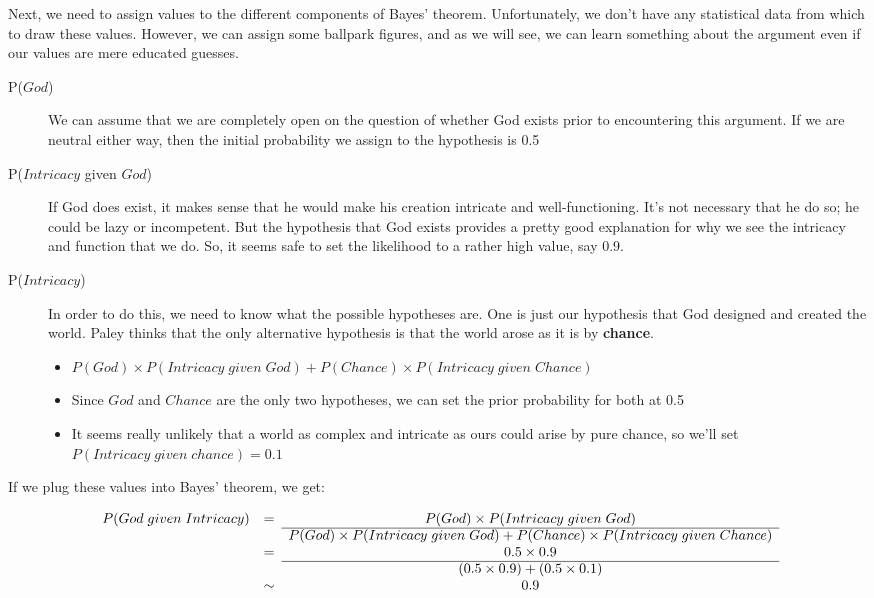 \documentclass[letterpaper,10pt]{article}
\begin{document}
Next, we need to assign values to the different components of Bayes' theorem.  Unfortunately, we don't have any statistical data from which to draw these values.  However, we can assign some ballpark figures, and as we will see, we can learn something about the argument even if our values are mere educated guesses.
\begin{description}
 \item [P($God$)] We can assume that we are completely open on the question of whether God exists prior to encountering this argument.  If we are neutral either way, then the initial probability we assign to the hypothesis is 0.5
 \item [P($Intricacy$ given $God$)] If God does exist, it makes sense that he would make his creation intricate and well-functioning. It's not necessary that he do so; he could be lazy or incompetent. But the hypothesis that God exists provides a pretty good explanation for why we see the intricacy and function that we do.  So, it seems safe to set the likelihood to a rather high value, say 0.9.
 \item [P($Intricacy$)] In order to do this, we need to know what the possible hypotheses are.  One is just our hypothesis that God designed and created the world.  Paley thinks that the only alternative hypothesis is that the world arose as it is by \textbf{chance}.
 	\begin{itemize}
 		\item $P(God)\times P(Intricacy\; given \; God) + P(Chance)\times P(Intricacy\; given\; Chance)$
 		\item Since $God$ and $Chance$ are the only two hypotheses, we can set the prior probability for both at 0.5
 		\item It seems really unlikely that a world as complex and intricate as ours could arise by pure chance, so we'll set $P(Intricacy\; given\; chance)=0.1$
 	\end{itemize}
\end{description}

If we plug these values into Bayes' theorem, we get:

\[\begin{array}{ccc}
P(God\; given \; Intricacy) & = & P(God) \times P(Intricacy\; given\; God) \\ \cline{3-3}
 & & P(God)\times P(Intricacy\; given \; God) + P(Chance)\times P(Intricacy\; given\; Chance) \\
 & = & 0.5 \times 0.9 \\ \cline{3-3}
 & & (0.5 \times 0.9) + (0.5 \times 0.1) \\
 & \sim & 0.9 \\
\end{array}\]
\end{document}
